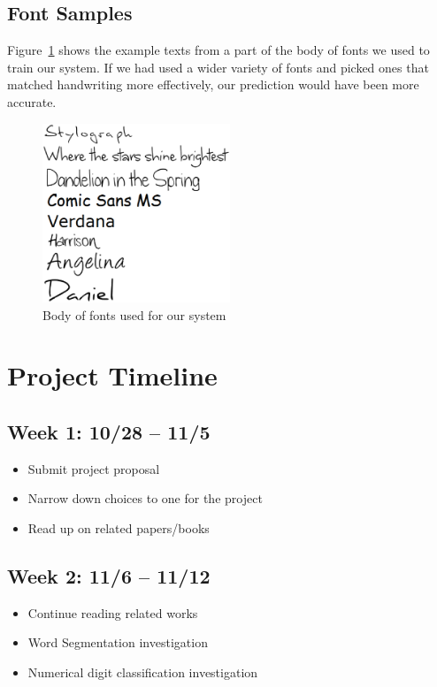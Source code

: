 \documentclass[12pt]{article}
\begin{document}
		\subsection{Font Samples}
		\label{appendix:data:font}
		
		Figure~\ref{figure:fonts} shows the example texts from a part of the body of fonts we used to train our system. If we had used a wider variety of fonts and picked ones that matched handwriting more effectively, our prediction would have been more accurate.

	\begin{figure}[htbp!]
	\centering
	\includegraphics[width=0.5\textwidth]{fonts.eps}
	\caption{Body of fonts used for our system}
	\label{figure:fonts}
	\end{figure}



	\section{Project Timeline}
		\subsection*{Week 1: 10/28 -- 11/5 }
			\begin{itemize}
				\item{Submit project proposal}
				\item{Narrow down choices to one for the project}
				\item{Read up on related papers/books}
			\end{itemize}
		\subsection*{Week 2: 11/6 -- 11/12  }
			\begin{itemize}
				\item{Continue reading related works}
				\item{Word Segmentation investigation}
				\item{Numerical digit classification investigation}
			\end{itemize}
\end{document}
